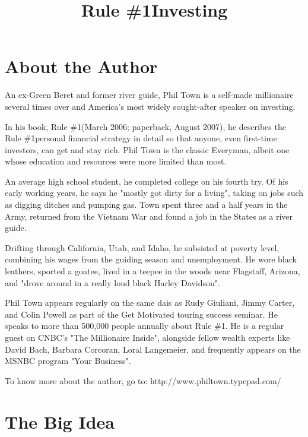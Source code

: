 \documentclass[a4paper]{jpconf}
\newcommand{\ruleone}{Rule \#1\space}
\begin{document}
\title{\ruleone Investing}

\author{}

\address{}



\section{About the Author}

An ex-Green Beret and former river guide, Phil Town is a self-made
millionaire several times over and America's most widely sought-after
speaker on investing. 

In his book, \ruleone (March 2006; paperback, August 2007), he
describes the \ruleone personal financial strategy in detail so that
anyone, even first-time investors, can get and stay rich.  Phil Town
is the classic Everyman, albeit one whose education and resources were
more limited than most.

An average high school student, he completed college on his fourth
try. Of his early working years, he says he "mostly got dirty for a
living", taking on jobs such as digging ditches and pumping gas. Town
spent three and a half years in the Army, returned from the Vietnam
War and found a job in the States as a river guide.  

Drifting through California, Utah, and Idaho, he subsisted at poverty
level, combining his wages from the guiding season and
unemployment. He wore black leathers, sported a goatee, lived in a
teepee in the woods near Flagstaff, Arizona, and "drove around in a
really loud black Harley Davidson".

Phil Town appears regularly on the same dais as Rudy Giuliani, Jimmy
Carter, and Colin Powell as part of the Get Motivated touring success
seminar. He speaks to more than 500,000 people annually about
\ruleone. He is a regular guest on CNBC's "The Millionaire Inside",
alongside fellow wealth experts like David Bach, Barbara Corcoran,
Loral Langemeier, and frequently appears on the MSNBC program "Your
Business".

To know more about the author, go to: http://www.philtown.typepad.com/

\section{The Big Idea}
\end{document}
